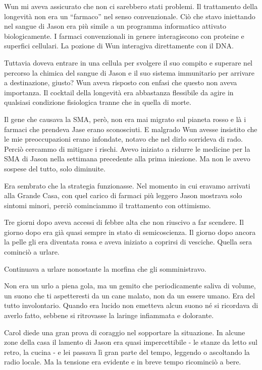 Wun mi aveva assicurato che non ci sarebbero stati problemi. Il
trattamento della longevità non era un ``farmaco'' nel senso
convenzionale. Ciò che stavo iniettando nel sangue di Jason era più
simile a un programma informatico attivato biologicamente. I farmaci
convenzionali in genere interagiscono con proteine e superfici
cellulari. La pozione di Wun interagiva direttamente con il DNA.

Tuttavia doveva entrare in una cellula per svolgere il suo compito e
superare nel percorso la chimica del sangue di Jason e il suo sistema
immunitario per arrivare a destinazione, giusto? Wun aveva risposto con
enfasi che questo non aveva importanza. Il cocktail della longevità era
abbastanza flessibile da agire in qualsiasi condizione fisiologica
tranne che in quella di morte.

Il gene che causava la SMA, però, non era mai migrato sul pianeta rosso
e là i farmaci che prendeva Jase erano sconosciuti. E malgrado Wun
avesse insistito che le mie preoccupazioni erano infondate, notavo che
nel dirlo sorrideva di rado. Perciò cercammo di mitigare i rischi. Avevo
iniziato a ridurre le medicine per la SMA di Jason nella settimana
precedente alla prima iniezione. Ma non le avevo sospese del tutto, solo
diminuite.

Era sembrato che la strategia funzionasse. Nel momento in cui eravamo
arrivati alla Grande Casa, con quel carico di farmaci più leggero Jason
mostrava solo sintomi minori, perciò cominciammo il trattamento con
ottimismo.

Tre giorni dopo aveva accessi di febbre alta che non riuscivo a far
scendere. Il giorno dopo era già quasi sempre in stato di semicoscienza.
Il giorno dopo ancora la pelle gli era diventata rossa e aveva iniziato
a coprirsi di vesciche. Quella sera cominciò a urlare.

Continuava a urlare nonostante la morfina che gli somministravo.

Non era un urlo a piena gola, ma un gemito che periodicamente saliva di
volume, un suono che ti aspetteresti da un cane malato, non da un essere
umano. Era del tutto involontario. Quando era lucido non emetteva alcun
suono né si ricordava di averlo fatto, sebbene si ritrovasse la laringe
infiammata e dolorante.

Carol diede una gran prova di coraggio nel sopportare la situazione. In
alcune zone della casa il lamento di Jason era quasi impercettibile - le
stanze da letto sul retro, la cucina - e lei passava lì gran parte del
tempo, leggendo o ascoltando la radio locale. Ma la tensione era
evidente e in breve tempo ricominciò a bere.

